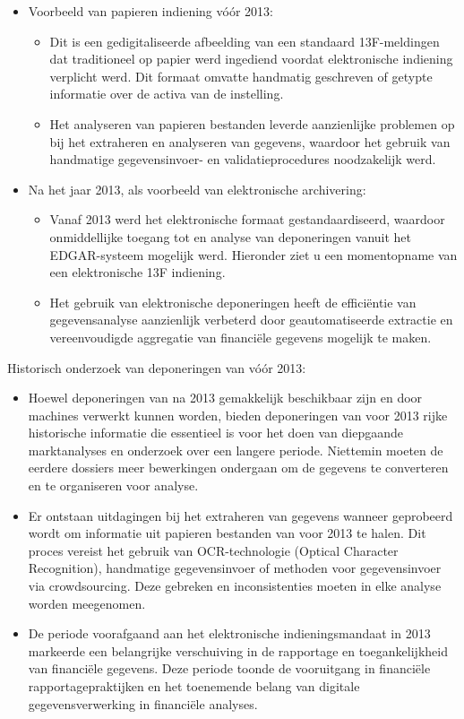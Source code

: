 \begin{itemize}
  \item Voorbeeld van papieren indiening vóór 2013:
  \begin{itemize}
    \item Dit is een gedigitaliseerde afbeelding van een standaard 13F-meldingen dat traditioneel op papier werd ingediend voordat elektronische indiening verplicht werd. Dit formaat omvatte handmatig geschreven of getypte informatie over de activa van de instelling.
    \item Het analyseren van papieren bestanden leverde aanzienlijke problemen op bij het extraheren en analyseren van gegevens, waardoor het gebruik van handmatige gegevensinvoer- en validatieprocedures noodzakelijk werd.
  \end{itemize}
  \item Na het jaar 2013, als voorbeeld van elektronische archivering:

  \begin{itemize}
    \item Vanaf 2013 werd het elektronische formaat gestandaardiseerd, waardoor onmiddellijke toegang tot en analyse van deponeringen vanuit het EDGAR-systeem mogelijk werd. Hieronder ziet u een momentopname van een elektronische 13F indiening.
    \item Het gebruik van elektronische deponeringen heeft de efficiëntie van gegevensanalyse aanzienlijk verbeterd door geautomatiseerde extractie en vereenvoudigde aggregatie van financiële gegevens mogelijk te maken.
  \end{itemize}

\end{itemize}


Historisch onderzoek van deponeringen van vóór 2013: 
\begin{itemize}
  \item Hoewel deponeringen van na 2013 gemakkelijk beschikbaar zijn en door machines verwerkt kunnen worden, bieden deponeringen van voor 2013 rijke historische informatie die essentieel is voor het doen van diepgaande marktanalyses en onderzoek over een langere periode. Niettemin moeten de eerdere dossiers meer bewerkingen ondergaan om de gegevens te converteren en te organiseren voor analyse.
  \item Er ontstaan uitdagingen bij het extraheren van gegevens wanneer geprobeerd wordt om informatie uit papieren bestanden van voor 2013 te halen. Dit proces vereist het gebruik van OCR-technologie (Optical Character Recognition), handmatige gegevensinvoer of methoden voor gegevensinvoer via crowdsourcing. Deze gebreken en inconsistenties moeten in elke analyse worden meegenomen.

  \item De periode voorafgaand aan het elektronische indieningsmandaat in 2013 markeerde een belangrijke verschuiving in de rapportage en toegankelijkheid van financiële gegevens. Deze periode toonde de vooruitgang in financiële rapportagepraktijken en het toenemende belang van digitale gegevensverwerking in financiële analyses.

\end{itemize}

